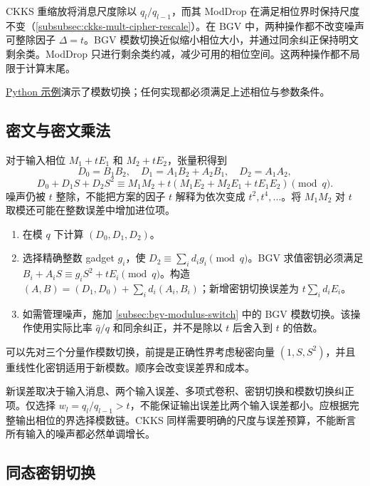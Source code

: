 CKKS 重缩放将消息尺度除以 $q_l/q_{l-1}$，而其 ModDrop 在满足相位界时保持尺度不变（\autoref{subsubsec:ckks-mult-cipher-rescale}）。在 BGV 中，两种操作都不改变噪声可整除因子 $\Delta=t$。BGV 模数切换近似缩小相位大小，并通过同余纠正保持明文剩余类。ModDrop 只进行剩余类约减，减少可用的相位空间。这两种操作都不局限于计算末尾。

 \href{https://github.com/wang2000star/fhe-textbook-cn/blob/chinese-edition/source%20code/bgv.py}{\underline{Python 示例}}演示了模数切换；任何实现都必须满足上述相位与参数条件。


\subsection{密文与密文乘法}
\label{subsec:bgv-mult-cipher}

对于输入相位 $M_1+tE_1$ 和 $M_2+tE_2$，张量积得到
\[
D_0=B_1B_2,\quad D_1=A_1B_2+A_2B_1,\quad D_2=A_1A_2,
\]
\[
D_0+D_1S+D_2S^2\equiv M_1M_2+t(M_1E_2+M_2E_1+tE_1E_2)\pmod q.
\]
噪声仍被 $t$ 整除，不能把方案的因子 $t$ 解释为依次变成 $t^2,t^4,\ldots$。将 $M_1M_2$ 对 $t$ 取模还可能在整数误差中增加进位项。

\begin{tcolorbox}[title={\textbf{\tboxlabel{\ref*{subsec:bgv-mult-cipher}} BGV 密文与密文乘法}}]
\begin{enumerate}
\item 在模 $q$ 下计算 $(D_0,D_1,D_2)$。
\item 选择精确整数 gadget $g_i$，使 $D_2\equiv\sum_i d_ig_i\pmod q$。BGV 求值密钥必须满足 $B_i+A_iS\equiv g_iS^2+tE_i\pmod q$。构造 $(A,B)=(D_1,D_0)+\sum_i d_i(A_i,B_i)$；新增密钥切换误差为 $t\sum_i d_iE_i$。
\item 如需管理噪声，施加 \autoref{subsec:bgv-modulus-switch} 中的 BGV 模数切换。该操作使用实际比率 $\widehat q/q$ 和同余纠正，并不是除以 $t$ 后舍入到 $t$ 的倍数。
\end{enumerate}
 可以先对三个分量作模数切换，前提是正确性界考虑秘密向量 $(1,S,S^2)$，并且重线性化密钥适用于新模数。顺序会改变误差界和成本。
\end{tcolorbox}

 新误差取决于输入消息、两个输入误差、多项式卷积、密钥切换和模数切换纠正项。仅选择 $w_l=q_l/q_{l-1}>t$，不能保证输出误差比两个输入误差都小。应根据完整输出相位的界选择模数链。CKKS 同样需要明确的尺度与误差预算，不能断言所有输入的噪声都必然单调增长。


\subsection{同态密钥切换}
\label{subsec:bgv-key-switching}

